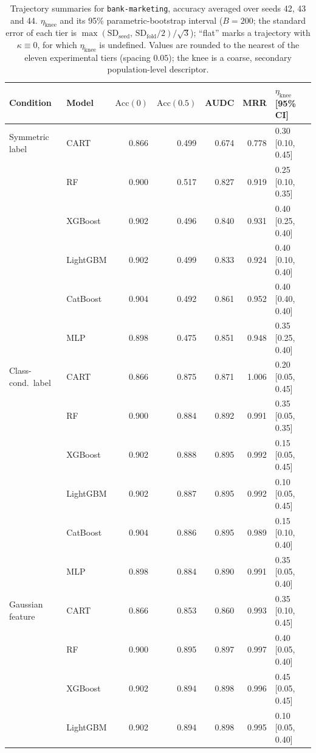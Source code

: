 \begin{table}[p]
\centering
\scriptsize
\setlength{\tabcolsep}{3.5pt}
\caption{Trajectory summaries for \texttt{bank-marketing}, accuracy averaged over seeds 42, 43 and 44. $\eta_{\mathrm{knee}}$ and its 95\% parametric-bootstrap interval ($B=200$; the standard error of each tier is $\max(\mathrm{SD}_{\mathrm{seed}},\,\mathrm{SD}_{\mathrm{fold}}/2)/\sqrt3$); ``flat'' marks a trajectory with $\kappa\equiv 0$, for which $\eta_{\mathrm{knee}}$ is undefined. Values are rounded to the nearest of the eleven experimental tiers (spacing $0.05$); the knee is a coarse, secondary population-level descriptor.}
\label{tab:traj_bank_marketing}
\begin{tabular}{@{}llrrrrl@{}}
\toprule
Condition & Model & $\mathrm{Acc}(0)$ & $\mathrm{Acc}(0.5)$ & AUDC & MRR & $\eta_{\mathrm{knee}}$ [95\% CI] \\
\midrule
Symmetric label & CART & 0.866 & 0.499 & 0.674 & 0.778 & 0.30 [0.10, 0.45] \\
 & RF & 0.900 & 0.517 & 0.827 & 0.919 & 0.25 [0.10, 0.35] \\
 & XGBoost & 0.902 & 0.496 & 0.840 & 0.931 & 0.40 [0.25, 0.40] \\
 & LightGBM & 0.902 & 0.499 & 0.833 & 0.924 & 0.40 [0.10, 0.40] \\
 & CatBoost & 0.904 & 0.492 & 0.861 & 0.952 & 0.40 [0.40, 0.40] \\
 & MLP & 0.898 & 0.475 & 0.851 & 0.948 & 0.35 [0.25, 0.40] \\
\midrule
Class-cond.\ label & CART & 0.866 & 0.875 & 0.871 & 1.006 & 0.20 [0.05, 0.45] \\
 & RF & 0.900 & 0.884 & 0.892 & 0.991 & 0.35 [0.05, 0.35] \\
 & XGBoost & 0.902 & 0.888 & 0.895 & 0.992 & 0.15 [0.05, 0.45] \\
 & LightGBM & 0.902 & 0.887 & 0.895 & 0.992 & 0.10 [0.05, 0.45] \\
 & CatBoost & 0.904 & 0.886 & 0.895 & 0.989 & 0.15 [0.10, 0.40] \\
 & MLP & 0.898 & 0.884 & 0.890 & 0.991 & 0.35 [0.05, 0.40] \\
\midrule
Gaussian feature & CART & 0.866 & 0.853 & 0.860 & 0.993 & 0.35 [0.10, 0.45] \\
 & RF & 0.900 & 0.895 & 0.897 & 0.997 & 0.40 [0.05, 0.40] \\
 & XGBoost & 0.902 & 0.894 & 0.898 & 0.996 & 0.45 [0.05, 0.45] \\
 & LightGBM & 0.902 & 0.894 & 0.898 & 0.995 & 0.10 [0.05, 0.40] \\

\end{tabular}
\end{table}
